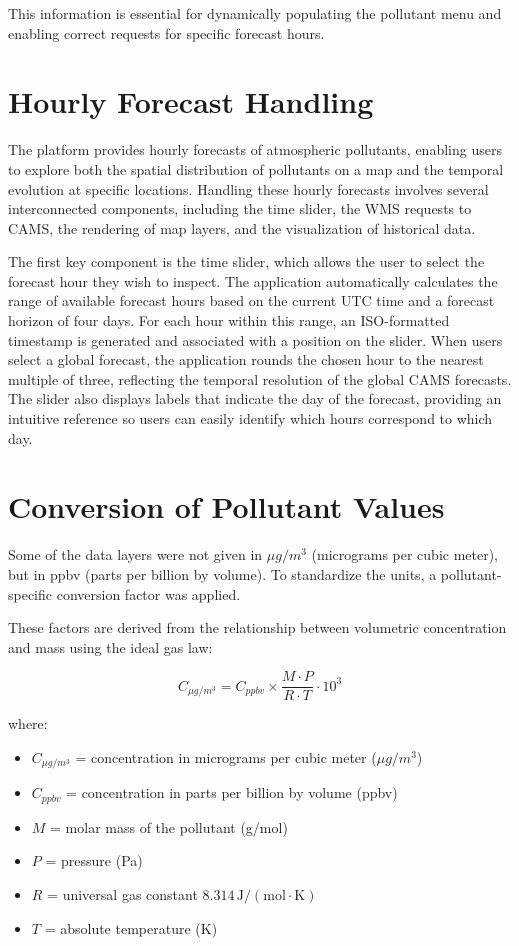This information is essential for dynamically populating the pollutant menu and enabling correct requests for specific forecast hours.


\section{Hourly Forecast Handling}

The platform provides hourly forecasts of atmospheric pollutants, enabling users to explore both the spatial distribution of pollutants on a map and the temporal evolution at specific locations. Handling these hourly forecasts involves several interconnected components, including the time slider, the WMS requests to CAMS, the rendering of map layers, and the visualization of historical data.

The first key component is the time slider, which allows the user to select the forecast hour they wish to inspect. The application automatically calculates the range of available forecast hours based on the current UTC time and a forecast horizon of four days. For each hour within this range, an ISO-formatted timestamp is generated and associated with a position on the slider. When users select a global forecast, the application rounds the chosen hour to the nearest multiple of three, reflecting the temporal resolution of the global CAMS forecasts. The slider also displays labels that indicate the day of the forecast, providing an intuitive reference so users can easily identify which hours correspond to which day.


\section{Conversion of Pollutant Values}

Some of the data layers were not given in \(\mu g/m^3\) (micrograms per cubic meter), but in ppbv (parts per billion by volume).  
To standardize the units, a pollutant-specific conversion factor was applied.  

These factors are derived from the relationship between volumetric concentration and mass using the ideal gas law:

\[
C_{\mu g/m^3} = C_{ppbv} \times \frac{M \cdot P}{R \cdot T} \cdot 10^3
\]

where:
\begin{itemize}
	\item \(C_{\mu g/m^3}\) = concentration in micrograms per cubic meter (\(\mu g/m^3\))  
	\item \(C_{ppbv}\) = concentration in parts per billion by volume (ppbv)  
	\item \(M\) = molar mass of the pollutant (g/mol)  
	\item \(P\) = pressure (Pa)  
	\item \(R\) = universal gas constant \(8.314\,\mathrm{J/(mol\cdot K)}\)  
	\item \(T\) = absolute temperature (K)  
\end{itemize}

